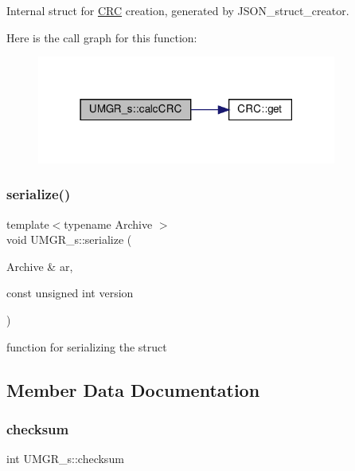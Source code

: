 Internal struct for \hyperlink{structCRC}{C\+RC} creation, generated by J\+S\+O\+N\+\_\+struct\+\_\+creator. 

Here is the call graph for this function\+:
\nopagebreak
\begin{figure}[H]
\begin{center}
\leavevmode
\includegraphics[width=279pt]{structUMGR__s_ae71a2770c3e37f1d859374359f99aae6_cgraph}
\end{center}
\end{figure}
\mbox{\label{structUMGR__s_af85ccf0554e33a7f7163c0d26ca791eb}} 
\subsubsection{\texorpdfstring{serialize()}{serialize()}}
{\footnotesize\ttfamily template$<$typename Archive $>$ \\
void U\+M\+G\+R\+\_\+s\+::serialize (\begin{DoxyParamCaption}\item[{Archive \&}]{ar,  }\item[{const unsigned int}]{version }\end{DoxyParamCaption})\hspace{0.3cm}{\ttfamily [inline]}}



function for serializing the struct 



\subsection{Member Data Documentation}
\mbox{\label{structUMGR__s_a3a98cb14c2b8c9545aa47871865076e6}} 
\subsubsection{\texorpdfstring{checksum}{checksum}}
{\footnotesize\ttfamily int U\+M\+G\+R\+\_\+s\+::checksum}

